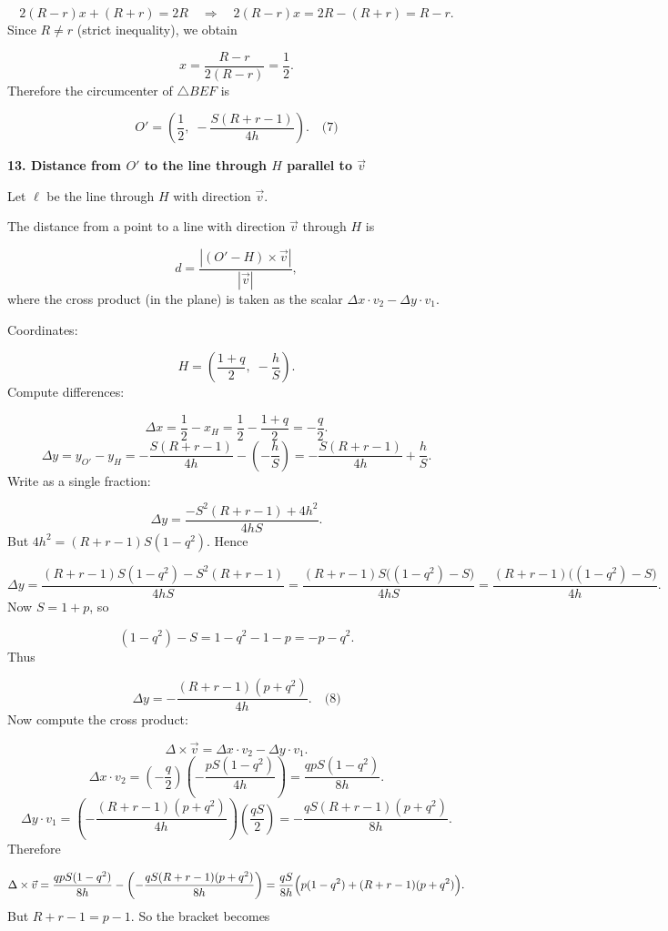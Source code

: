 \documentclass{llmxive}
\providecommand{\solutionheading}[1]{\par\smallskip\noindent\textbf{#1}\par}
\begin{document}
\[
2(R - r) x + (R + r) = 2R
\quad\Longrightarrow\quad 2(R - r) x = 2R - (R + r) = R - r.
\]
Since \(R \neq r\) (strict inequality), we obtain\par
\[
x = \frac{R - r}{2(R - r)} = \frac12.
\]
Therefore the circumcenter of \(\triangle BEF\) is\par
\[
O' = \left(\frac12,\; -\frac{S (R+r-1)}{4h}\right). \quad\text{(7)}
\]
\solutionheading{13. Distance from \(O'\) to the line through \(H\) parallel to \(\vec{v}\)}
Let \(\ell\) be the line through \(H\) with direction \(\vec{v}\).\par
The distance from a point to a line with direction \(\vec{v}\) through \(H\) is\par
\[
d = \frac{|(O' - H) \times \vec{v}|}{|\vec{v}|},
\]
where the cross product (in the plane) is taken as the scalar \(\Delta x\cdot v_2 - \Delta y\cdot v_1\).\par
Coordinates:\par
\[
H = \left(\frac{1+q}{2},\; -\frac{h}{S}\right).
\]
Compute differences:\par
\[
\Delta x = \frac12 - x_H = \frac12 - \frac{1+q}{2} = -\frac{q}{2}.
\]
\[
\Delta y = y_{O'} - y_H = -\frac{S (R+r-1)}{4h} - \left(-\frac{h}{S}\right) = -\frac{S (R+r-1)}{4h} + \frac{h}{S}.
\]
Write as a single fraction:\par
\[
\Delta y = \frac{ -S^2 (R+r-1) + 4h^2 }{4h S}.
\]
But \(4h^2 = (R+r-1) S (1 - q^2)\). Hence\par
\[
\Delta y = \frac{ (R+r-1) S (1 - q^2) - S^2 (R+r-1) }{4h S}
= \frac{ (R+r-1) S \bigl( (1 - q^2) - S \bigr)}{4h S}
= \frac{ (R+r-1) \bigl( (1 - q^2) - S \bigr)}{4h}.
\]
Now \(S = 1 + p\), so\par
\[
(1 - q^2) - S = 1 - q^2 - 1 - p = -p - q^2.
\]
Thus\par
\[
\Delta y = -\frac{ (R+r-1) (p + q^2)}{4h}. \quad\text{(8)}
\]
Now compute the cross product:\par
\[
\Delta \times \vec{v} = \Delta x \cdot v_2 - \Delta y \cdot v_1.
\]
\[
\Delta x \cdot v_2 = \left(-\frac{q}{2}\right)\left(-\frac{p S (1 - q^2)}{4h}\right) = \frac{q p S (1 - q^2)}{8h}.
\]
\[
\Delta y \cdot v_1 = \left(-\frac{ (R+r-1) (p + q^2)}{4h}\right) \left(\frac{q S}{2}\right) = -\frac{q S (R+r-1) (p + q^2)}{8h}.
\]
Therefore\par
\[
\Delta \times \vec{v} = \frac{q p S (1 - q^2)}{8h} - \left( -\frac{q S (R+r-1) (p + q^2)}{8h} \right)
= \frac{q S}{8h}\Bigl( p (1 - q^2) + (R+r-1)(p + q^2) \Bigr).
\]
But \(R+r-1 = p - 1\). So the bracket becomes\par
\end{document}
